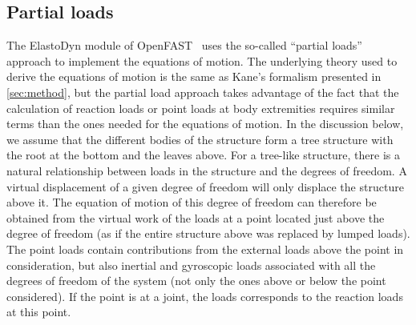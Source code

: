 \documentclass[wes, manuscript]{copernicus}
\newcommand{\m}[1]{\boldsymbol{#1}}
\newcommand{\todoBoth}    [1]{{\colorbox{yellow}{TODO Both:    }}{\color{red}{#1}}\colorbox{yellow}{/}}
\begin{document}

\clearpage
\subsection{Partial loads}
\label{sec:PartialLoads}
The ElastoDyn module of OpenFAST~\citep{OpenFAST} uses the so-called ``partial loads'' approach to implement the equations of motion.
The underlying theory used to derive the equations of motion is the same as Kane's formalism presented in \autoref{sec:method}, but the partial load approach takes advantage of the fact that the calculation of reaction loads or point loads at body extremities requires similar terms than the ones needed for the equations of motion.
In the discussion below, we assume that the different bodies of the structure form a tree structure with the root at the bottom and the leaves above.
For a tree-like structure, there is a natural relationship between loads in the structure and the degrees of freedom.
A virtual displacement of a given degree of freedom will only displace the structure above it. The equation of motion of this degree of freedom can therefore be obtained from the virtual work of the  loads at a point located just above the degree of freedom (as if the entire structure above was replaced by lumped loads).
The point loads contain contributions from the external loads above the point in consideration, but also inertial and gyroscopic loads associated with all the degrees of freedom of the system (not only the ones above or below the point considered). If the point is at a joint, the loads corresponds to the reaction loads at this point.
\end{document}
